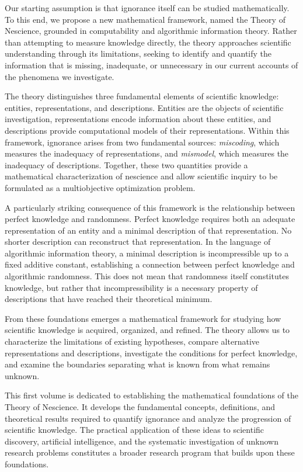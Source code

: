 Our starting assumption is that ignorance itself can be studied mathematically. To this end, we propose a new mathematical framework, named the Theory of Nescience, grounded in computability and algorithmic information theory. Rather than attempting to measure knowledge directly, the theory approaches scientific understanding through its limitations, seeking to identify and quantify the information that is missing, inadequate, or unnecessary in our current accounts of the phenomena we investigate.

The theory distinguishes three fundamental elements of scientific knowledge: entities, representations, and descriptions. Entities are the objects of scientific investigation, representations encode information about these entities, and descriptions provide computational models of their representations. Within this framework, ignorance arises from two fundamental sources: \emph{miscoding}, which measures the inadequacy of representations, and \emph{mismodel}, which measures the inadequacy of descriptions. Together, these two quantities provide a mathematical characterization of nescience and allow scientific inquiry to be formulated as a multiobjective optimization problem.

A particularly striking consequence of this framework is the relationship between perfect knowledge and randomness. Perfect knowledge requires both an adequate representation of an entity and a minimal description of that representation. No shorter description can reconstruct that representation. In the language of algorithmic information theory, a minimal description is incompressible up to a fixed additive constant, establishing a connection between perfect knowledge and algorithmic randomness. This does not mean that randomness itself constitutes knowledge, but rather that incompressibility is a necessary property of descriptions that have reached their theoretical minimum.

From these foundations emerges a mathematical framework for studying how scientific knowledge is acquired, organized, and refined. The theory allows us to characterize the limitations of existing hypotheses, compare alternative representations and descriptions, investigate the conditions for perfect knowledge, and examine the boundaries separating what is known from what remains unknown.

This first volume is dedicated to establishing the mathematical foundations of the Theory of Nescience. It develops the fundamental concepts, definitions, and theoretical results required to quantify ignorance and analyze the progression of scientific knowledge. The practical application of these ideas to scientific discovery, artificial intelligence, and the systematic investigation of unknown research problems constitutes a broader research program that builds upon these foundations.

